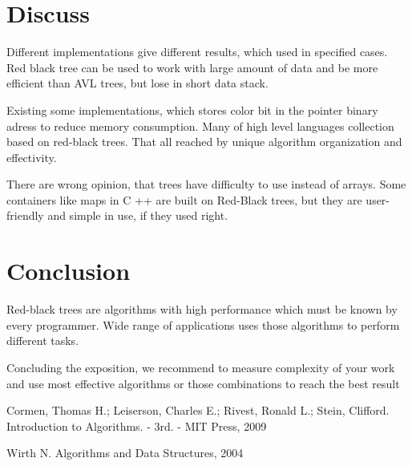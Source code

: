 \documentclass[twoside,twocolumn]{article}
\begin{document}
\section{Discuss}
Different implementations give different results, which used in specified cases. Red black tree can be used to work with large amount of data and be more efficient than AVL trees, but lose in short data stack.

Existing some implementations, which stores color bit in the pointer binary adress to reduce memory consumption. Many of high level languages collection based on red-black trees. That all reached by unique algorithm organization and effectivity.

There are wrong opinion, that trees have difficulty to use instead of arrays. Some containers like maps in C ++  are built on Red-Black trees, but they are user-friendly and simple in use, if they used right.
\section{Conclusion}
Red-black trees are algorithms with high performance which must be known by every programmer. Wide range of applications uses those algorithms to perform different tasks.

Concluding the exposition, we recommend to measure complexity of your work and use most effective algorithms or those combinations to reach the best result



\begin{thebibliography}{99} 
\item Cormen, Thomas H.; Leiserson, Charles E.; Rivest, Ronald L.; Stein, Clifford. Introduction to Algorithms. - 3rd. - MIT Press, 2009
\item Wirth N. Algorithms and Data Structures, 2004
\end{thebibliography}

\end{document}
